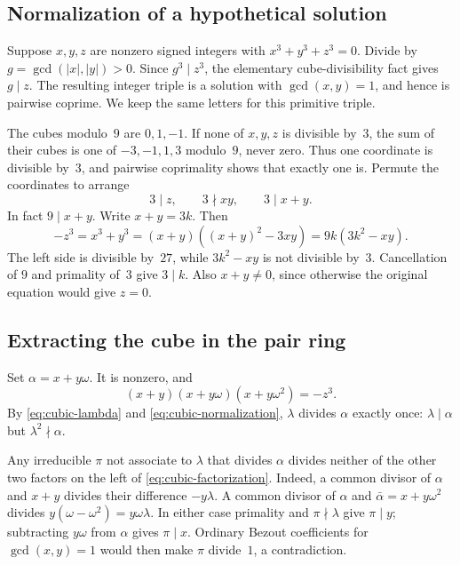 \subsection{Normalization of a hypothetical solution}

Suppose $x,y,z$ are nonzero signed integers with
$x^3+y^3+z^3=0$.  Divide by $g=\gcd(|x|,|y|)>0$.
Since $g^3\mid z^3$, the elementary cube-divisibility fact gives
$g\mid z$.  The resulting integer triple is a solution with
$\gcd(x,y)=1$, and hence is pairwise coprime.  We keep the same letters
for this primitive triple.

The cubes modulo~$9$ are $0,1,-1$.  If none of $x,y,z$ is divisible
by~$3$, the sum of their cubes is one of $-3,-1,1,3$ modulo~$9$, never
zero.  Thus one coordinate is divisible by~$3$, and pairwise coprimality
shows that exactly one is.  Permute the coordinates to arrange
\begin{equation}
 3\mid z,\qquad 3\nmid xy,\qquad 3\mid x+y.
 \label{eq:cubic-normalization}
\end{equation}
In fact $9\mid x+y$.  Write $x+y=3k$.  Then
\[
 -z^3=x^3+y^3=(x+y)((x+y)^2-3xy)
                  =9k(3k^2-xy).
\]
The left side is divisible by~$27$, while $3k^2-xy$ is not divisible
by~$3$.  Cancellation of $9$ and primality of~$3$ give $3\mid k$.
Also $x+y\ne0$, since otherwise the original equation would give $z=0$.

\subsection{Extracting the cube in the pair ring}

Set $\alpha=x+y\omega$.  It is nonzero, and
\begin{equation}
 (x+y)(x+y\omega)(x+y\omega^2)=-z^3.
 \label{eq:cubic-factorization}
\end{equation}
By \eqref{eq:cubic-lambda} and
\eqref{eq:cubic-normalization}, $\lambda$ divides $\alpha$ exactly once:
$\lambda\mid\alpha$ but $\lambda^2\nmid\alpha$.

Any irreducible $\pi$ not associate to $\lambda$ that divides $\alpha$
divides neither of the other two factors on the left of
\eqref{eq:cubic-factorization}.  Indeed, a common divisor of $\alpha$
and $x+y$ divides their difference $-y\lambda$.  A common divisor of
$\alpha$ and $\bar\alpha=x+y\omega^2$ divides
$y(\omega-\omega^2)=y\omega\lambda$.  In either case primality and
$\pi\nmid\lambda$ give $\pi\mid y$; subtracting $y\omega$ from
$\alpha$ gives $\pi\mid x$.  Ordinary Bezout coefficients for
$\gcd(x,y)=1$ would then make $\pi$ divide~$1$, a contradiction.

